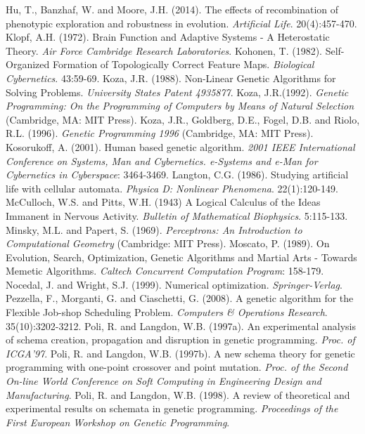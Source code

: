 \documentclass[spanish,a4paper,12pt,twoside]{report}
\begin{document}
\begin{thebibliography}{00}
   Hu, T., Banzhaf, W. and Moore, J.H. (2014). The effects of recombination of phenotypic exploration and robustness in evolution. \emph{Artificial Life}. 20(4):457-470.
   Klopf, A.H. (1972). Brain Function and Adaptive Systems - A Heterostatic Theory. \emph{Air Force Cambridge Research Laboratories}.
   Kohonen, T. (1982). Self-Organized Formation of Topologically Correct Feature Maps. \emph{Biological Cybernetics}. 43:59-69.
   Koza, J.R. (1988). Non-Linear Genetic Algorithms for Solving Problems. \emph{University States Patent 4935877}.
   Koza, J.R.(1992). \emph{Genetic Programming: On the Programming of Computers by Means of Natural Selection}  (Cambridge, MA: MIT Press).
   Koza, J.R., Goldberg, D.E., Fogel, D.B. and Riolo, R.L. (1996). \emph{Genetic Programming 1996} (Cambridge, MA: MIT Press).
   Kosorukoff, A. (2001). Human based genetic algorithm. \emph{2001 IEEE International Conference on Systems, Man and Cybernetics. e-Systems and e-Man for Cybernetics in Cyberspace}: 3464-3469.
   Langton, C.G. (1986). Studying artificial life with cellular automata. \emph{Physica D: Nonlinear Phenomena}. 22(1):120-149.
   McCulloch, W.S. and Pitts, W.H. (1943) A Logical Calculus of the Ideas Immanent in Nervous Activity. \emph{Bulletin of Mathematical Biophysics}. 5:115-133.
   Minsky, M.L. and Papert, S. (1969). \emph{Perceptrons: An Introduction to Computational Geometry} (Cambridge: MIT Press).
   Moscato, P. (1989). On Evolution, Search, Optimization, Genetic Algorithms and Martial Arts - Towards Memetic Algorithms. \emph{Caltech Concurrent Computation Program}: 158-179.
   Nocedal, J. and Wright, S.J. (1999). Numerical optimization. \emph{Springer-Verlag}.
   Pezzella, F., Morganti, G. and Ciaschetti, G. (2008). A genetic algorithm for the Flexible Job-shop Scheduling Problem. \emph{Computers \& Operations Research}. 35(10):3202-3212.
   Poli, R. and Langdon, W.B. (1997a). An experimental analysis of schema creation, propagation and disruption in genetic programming. \emph{Proc. of ICGA'97}.
   Poli, R. and Langdon, W.B. (1997b). A new schema theory for genetic programming with one-point crossover and point mutation. \emph{Proc. of the Second On-line World Conference on Soft Computing in Engineering Design and Manufacturing}.
   Poli, R. and Langdon, W.B. (1998). A review of theoretical and experimental results on schemata in genetic programming. \emph{Proceedings of the First European Workshop on Genetic Programming}.

\end{thebibliography}
\end{document}
